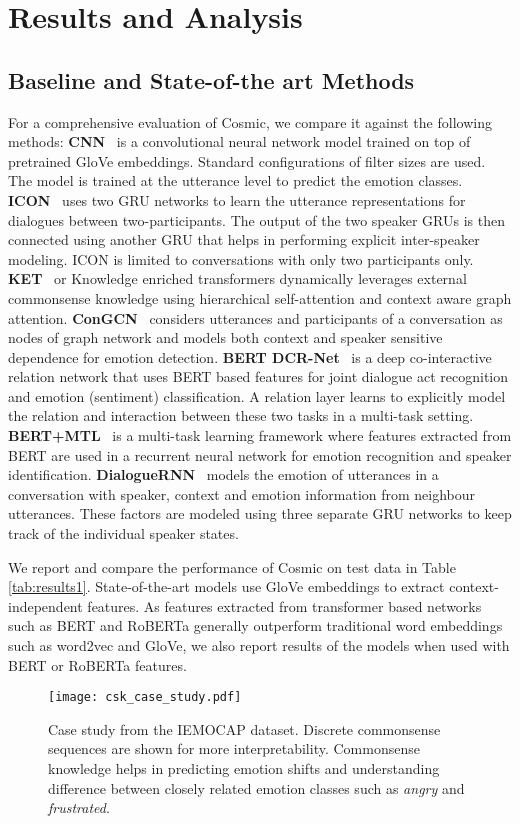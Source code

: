 \documentclass[11pt,a4paper]{article}
\begin{document}
\section{Results and Analysis}
\label{sec:result}

\subsection{Baseline and State-of-the art Methods}
For a comprehensive evaluation of {\sc Cosmic}, we compare it against the following methods: \textbf{CNN}~\cite{kim2014convolutional} is a convolutional neural network model trained on top of pretrained GloVe embeddings. Standard configurations of filter sizes are used.
The model is trained at the utterance level to predict the emotion classes.
\textbf{ICON}~\cite{hazarika-EtAl:2018:N18-1} uses two GRU networks to learn the utterance representations for dialogues between two-participants. The output of the two speaker GRUs is then connected using another GRU that helps in performing explicit inter-speaker modeling.
ICON is limited to conversations with only two participants only.
\textbf{KET}~\cite{zhong2019knowledge} or Knowledge enriched transformers dynamically leverages external commonsense knowledge using hierarchical self-attention and context aware graph attention.
\textbf{ConGCN}~\cite{zhang2019modeling} considers utterances and participants of a conversation as nodes of graph network and models both context and speaker sensitive dependence for emotion detection.
\textbf{BERT DCR-Net}~\cite{qindcr2020dcrnet} is a deep co-interactive relation network that uses BERT based features for joint dialogue act recognition and emotion (sentiment) classification.
A relation layer learns to explicitly model the relation and interaction between these two tasks in a multi-task setting.
\textbf{BERT+MTL}~\cite{Li2020MultiTaskLW} is a multi-task learning framework where features extracted from BERT are used in a recurrent neural network for emotion recognition and speaker identification.
\textbf{DialogueRNN}~\cite{dialoguernn} models the emotion of utterances
in a conversation with
speaker, context and emotion information from neighbour utterances.
These factors are modeled using three separate GRU networks to  keep track of the individual speaker states.


We report and compare the performance of {\sc Cosmic} on test data
in Table \ref{tab:results1}.
State-of-the-art models use GloVe embeddings to extract context-independent features. As features extracted from transformer based networks such as BERT and RoBERTa generally outperform traditional word embeddings such as word2vec and GloVe, we also report results of the models when used with
BERT or RoBERTa features.
\begin{figure*}[t]
    \centering
    \texttt{[image: csk\_case\_study.pdf]}
    \caption{Case study from the IEMOCAP dataset. Discrete commonsense sequences are shown for more interpretability. Commonsense knowledge helps in predicting emotion shifts and understanding difference between closely related emotion classes such as \textit{angry} and \textit{frustrated}.}
    \label{fig:case_study}
\end{figure*}
\end{document}
